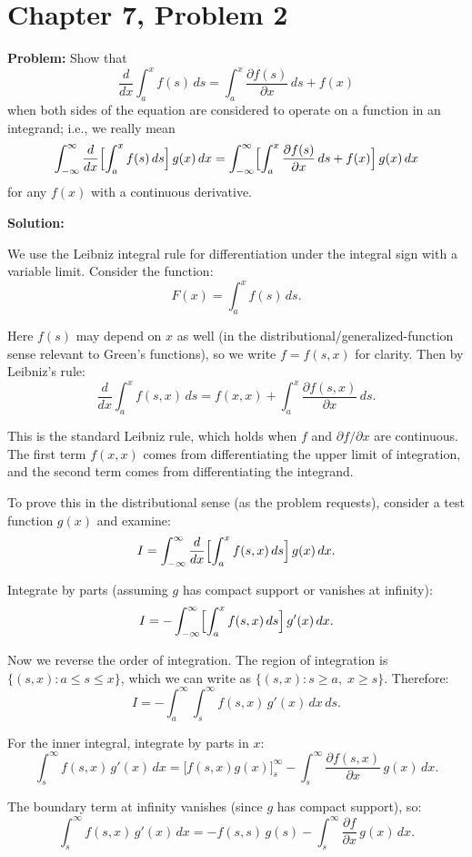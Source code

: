 \documentclass[12pt]{article}
\begin{document}
\section*{Chapter 7, Problem 2}

\textbf{Problem:} Show that
\[
\frac{d}{dx}\int_a^x f(s)\,ds = \int_a^x \frac{\partial f(s)}{\partial x}\,ds + f(x)
\]
when both sides of the equation are considered to operate on a function in an integrand; i.e., we really mean
\[
\int_{-\infty}^{\infty}\frac{d}{dx}\Bigl[\int_a^x f(s)\,ds\Bigr]\,g(x)\,dx = \int_{-\infty}^{\infty}\Bigl[\int_a^x \frac{\partial f(s)}{\partial x}\,ds + f(x)\Bigr]\,g(x)\,dx
\]
for any $f(x)$ with a continuous derivative.

\bigskip
\textbf{Solution:}

We use the Leibniz integral rule for differentiation under the integral sign with a variable limit. Consider the function:
\[
F(x) = \int_a^x f(s)\,ds.
\]

Here $f(s)$ may depend on $x$ as well (in the distributional/generalized-function sense relevant to Green's functions), so we write $f = f(s,x)$ for clarity. Then by Leibniz's rule:
\[
\frac{d}{dx}\int_a^x f(s,x)\,ds = f(x,x) + \int_a^x \frac{\partial f(s,x)}{\partial x}\,ds.
\]

This is the standard Leibniz rule, which holds when $f$ and $\partial f/\partial x$ are continuous. The first term $f(x,x)$ comes from differentiating the upper limit of integration, and the second term comes from differentiating the integrand.

To prove this in the distributional sense (as the problem requests), consider a test function $g(x)$ and examine:
\[
I = \int_{-\infty}^{\infty} \frac{d}{dx}\Bigl[\int_a^x f(s,x)\,ds\Bigr]\,g(x)\,dx.
\]

Integrate by parts (assuming $g$ has compact support or vanishes at infinity):
\[
I = -\int_{-\infty}^{\infty}\Bigl[\int_a^x f(s,x)\,ds\Bigr]\,g'(x)\,dx.
\]

Now we reverse the order of integration. The region of integration is $\{(s,x): a \le s \le x\}$, which we can write as $\{(s,x): s \ge a,\; x \ge s\}$. Therefore:
\[
I = -\int_a^{\infty}\int_s^{\infty} f(s,x)\,g'(x)\,dx\,ds.
\]

For the inner integral, integrate by parts in $x$:
\[
\int_s^{\infty} f(s,x)\,g'(x)\,dx = \bigl[f(s,x)g(x)\bigr]_s^{\infty} - \int_s^{\infty}\frac{\partial f(s,x)}{\partial x}\,g(x)\,dx.
\]

The boundary term at infinity vanishes (since $g$ has compact support), so:
\[
\int_s^{\infty} f(s,x)\,g'(x)\,dx = -f(s,s)\,g(s) - \int_s^{\infty}\frac{\partial f}{\partial x}\,g(x)\,dx.
\]
\end{document}
